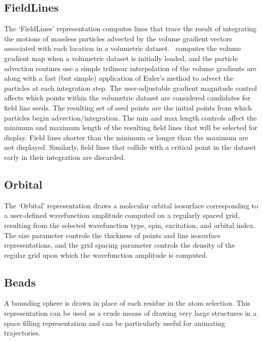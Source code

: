 \subsection{FieldLines}
\label{ug:topic:drawmethods:fieldlines}
The `FieldLines' representation computes lines that trace the result
of integrating the motions of massless particles advected by the 
volume gradient vectors associated with each location in a volumetric
dataset.  \VMD\ computes the volume gradient map when a volumetric dataset
is initially loaded, and the particle advection routines use a simple
trilinear interpolation of the volume gradients are along with a fast
(but simple) application of Euler's method to advect the particles at 
each integration step.  The user-adjustable gradient magnitude control
affects which points within the volumetric dataset are considered 
candidates for field line seeds.  The resulting set of seed points
are the initial points from which particles begin advection/integration.
The min and max length controls affect the minimum and maximum length of
the resulting field lines that will be selected for display.  Field lines
shorter than the minimum or longer than the maximum are not displayed.
Similarly, field lines that collide with a critical point in the dataset
early in their integration are discarded.


\subsection{Orbital}
\label{ug:topic:drawmethods:orbital}
The `Orbital' representation draws a molecular orbital isosurface 
corresponding to a user-defined wavefunction amplitude computed on a 
regularly spaced grid, resulting from the selected wavefunction type,
spin, excitation, and orbital index.  The size parameter controls the
thickness of points and line isosurface representations, and the grid
spacing parameter controls the density of the regular grid upon which
the wavefunction amplitude is computed.


\subsection{Beads}
\label{ug:topic:drawmethods:beads}
A bounding sphere is drawn in place of each residue in the atom selection.
This representation can be used as a crude means of drawing very large
structures in a space filling representation and can be particularly useful
for animating trajectories.

